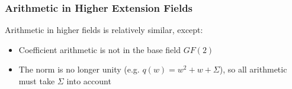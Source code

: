 \documentclass[10pt]{beamer}
\begin{document}
\begin{frame}
	\frametitle{Arithmetic in Higher Extension Fields}
	Arithmetic in higher fields is relatively similar, except:
	\begin{itemize}
		\item Coefficient arithmetic is not in the base field $GF(2)$
		\item The norm is no longer unity (e.g. $q(w) = w^2 + w + \Sigma$), so all arithmetic must take $\Sigma$ into account
	\end{itemize}
\end{frame}




\end{document}
